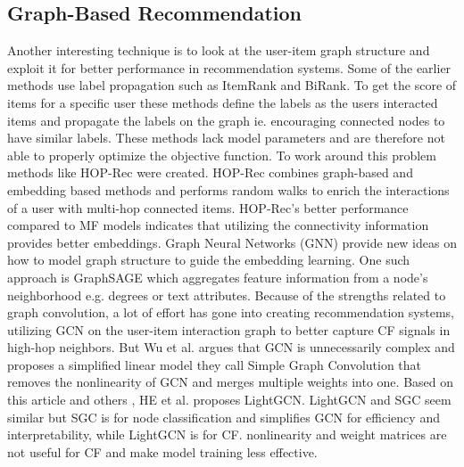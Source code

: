 \subsection{Graph-Based Recommendation}
Another interesting technique is to look at the user-item graph structure and exploit it for better performance in recommendation systems.
Some of the earlier methods use label propagation such as ItemRank\cite{ItemRank} and BiRank\cite{BiRank}.
To get the score of items for a specific user these methods define the labels as the users interacted items and propagate the labels on the graph ie. encouraging connected nodes to have similar labels.
These methods lack model parameters and are therefore not able to properly optimize the objective function\cite{NGCF_2019}.
To work around this problem methods like HOP-Rec \cite{HOP_Rec} were created.
HOP-Rec combines graph-based and embedding based methods and performs random walks to enrich the interactions of a user with multi-hop connected items.
HOP-Rec's better performance compared to MF models indicates that utilizing the connectivity information provides better embeddings.
Graph Neural Networks (GNN) provide new ideas on how to model graph structure to guide the embedding learning.
One such approach is GraphSAGE\cite{IND_REP_LEA} which aggregates feature information from a node's neighborhood e.g. degrees or text attributes.
Because of the strengths related to graph convolution, a lot of effort has gone into creating recommendation systems\cite{NGCF_2019,GC_MC,Priceaware}, utilizing GCN on the user-item interaction graph to better capture CF signals in high-hop neighbors.
But Wu et al. \cite{SGCN} argues that GCN is unnecessarily complex and proposes a simplified linear model they call Simple Graph Convolution that removes the nonlinearity of GCN and merges multiple weights into one.
Based on this article and others \cite{PRE_PROP,DEEP_GCN}, HE et al. \cite{lightgcn} proposes LightGCN.
LightGCN and SGC seem similar but SGC is for node classification and simplifies GCN for efficiency and interpretability, while LightGCN is for CF.
nonlinearity and weight matrices are not useful for CF and make model training less effective.
